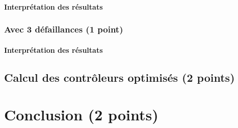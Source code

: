 \documentclass[a4paper]{book}
\begin{document}
\paragraph{Interprétation des résultats}

\subsubsection{Avec 3 défaillances (1 point)}


%
%
%
\paragraph{Interprétation des résultats}

\subsection{Calcul des contrôleurs optimisés (2 points)}

\section{Conclusion (2 points)}
\end{document}
